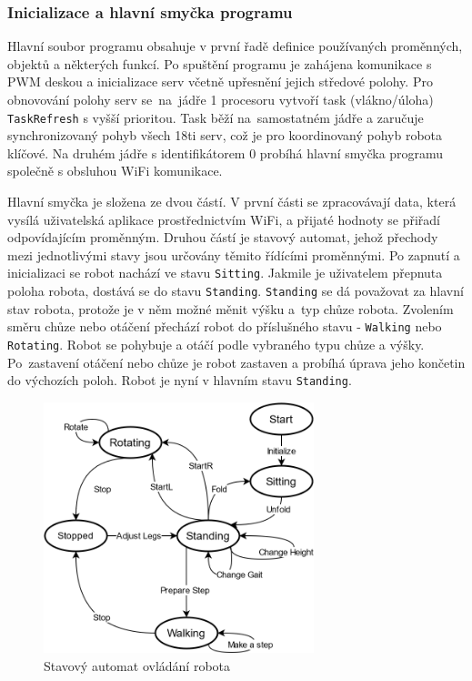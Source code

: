\subsubsection*{Inicializace a hlavní smyčka programu}
Hlavní soubor programu obsahuje v první řadě definice používaných proměnných, objektů a některých funkcí. Po spuštění programu je zahájena komunikace s PWM deskou a inicializace serv včetně upřesnění jejich středové polohy. Pro obnovování polohy serv se~na~jádře 1 procesoru vytvoří task (vlákno/úloha) \texttt{TaskRefresh} s vyšší prioritou. Task běží na~samostatném jádře a zaručuje synchronizovaný pohyb všech 18ti serv, což je pro koordinovaný pohyb robota klíčové. Na druhém jádře s identifikátorem 0 probíhá hlavní smyčka programu společně s obsluhou WiFi komunikace.

Hlavní smyčka je složena ze dvou částí. V první části se zpracovávají data, která vysílá uživatelská aplikace prostřednictvím WiFi, a přijaté hodnoty se přiřadí odpovídajícím proměnným. Druhou částí je stavový automat, jehož přechody mezi jednotlivými stavy jsou určovány těmito řídícími proměnnými. Po zapnutí a inicializaci se robot nachází ve stavu \texttt{Sitting}. Jakmile je uživatelem přepnuta poloha robota, dostává se do stavu \texttt{Standing}. \texttt{Standing} se dá považovat za hlavní stav robota, protože je v něm možné měnit výšku a~typ chůze robota. Zvolením směru chůze nebo otáčení přechází robot do příslušného stavu - \texttt{Walking} nebo \texttt{Rotating}. Robot se pohybuje a otáčí podle vybraného typu chůze a výšky. Po~zastavení otáčení nebo chůze je robot zastaven a probíhá úprava jeho končetin do výchozích poloh. Robot je nyní v hlavním stavu \texttt{Standing}.

\begin{figure}[hbt]
	\centering
	\includegraphics[width=0.7\textwidth]{obrazky-figures/HexStateMachine.png}
	\caption{Stavový automat ovládání robota}
    \label{statemachine}
\end{figure}

